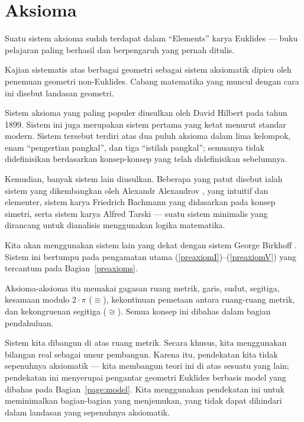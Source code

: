   
\chapter{Aksioma}
\label{chap:axioms}

\vspace*{-3\baselineskip}

Suatu sistem aksioma sudah terdapat dalam ``Elements'' karya Euklides --- buku pelajaran paling berhasil dan berpengaruh yang pernah ditulis.

Kajian sistematis atas berbagai geometri sebagai sistem aksiomatik
 dipicu
oleh penemuan geometri non-Euklides.
Cabang matematika yang muncul dengan cara ini disebut landasan geometri.

Sistem aksioma yang paling populer
diusulkan oleh David Hilbert pada tahun 1899.
Sistem ini juga merupakan sistem pertama yang ketat menurut standar modern.
Sistem tersebut terdiri atas dua puluh aksioma dalam lima kelompok, enam ``pengertian pangkal'', dan tiga ``istilah pangkal'';
semuanya tidak didefinisikan berdasarkan konsep-konsep yang telah didefinisikan sebelumnya.

Kemudian, banyak sistem lain diusulkan.
Beberapa yang patut disebut ialah
sistem yang dikembangkan oleh Alexandr Alexandrov \cite{alexandrov}, yang intuitif dan elementer,
sistem karya Friedrich Bachmann \cite{bachmann} yang didasarkan pada konsep simetri,
serta sistem karya Alfred Tarski \cite{tarski} --- suatu sistem minimalis yang dirancang untuk dianalisis menggunakan logika matematika.

Kita akan menggunakan sistem lain yang dekat dengan sistem George Birkhoff \cite{birkhoff}.
Sistem ini bertumpu pada pengamatan utama (\ref{preaxiomI})--(\ref{preaxiomV}) yang tercantum pada Bagian~\ref{preaxioms}.

Aksioma-aksioma itu memakai gagasan 
ruang metrik, 
garis, 
sudut,
segitiga,
kesamaan modulo $2\cdot\pi$ ($\equiv$), 
kekontinuan pemetaan antara ruang-ruang metrik,
dan kekongruenan segitiga ($\cong$).
Semua konsep ini dibahas dalam bagian pendahuluan.

Sistem kita dibangun di atas ruang metrik.
Secara khusus, kita menggunakan bilangan real sebagai unsur pembangun. 
Karena itu, pendekatan kita tidak sepenuhnya aksiomatik --- kita membangun teori ini di atas sesuatu yang lain;
pendekatan ini menyerupai pengantar geometri Euklides berbasis model yang dibahas pada Bagian~\ref{page:model}.
Kita menggunakan pendekatan ini untuk meminimalkan bagian-bagian yang menjemukan, yang tidak dapat dihindari dalam landasan yang sepenuhnya aksiomatik.

